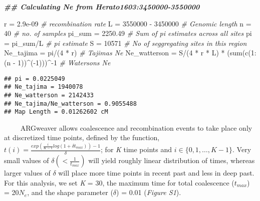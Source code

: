 \documentclass[
]{article}
\newenvironment{Shaded}{\begin{snugshade}}{\end{snugshade}}
\newcommand{\CommentTok}[1]{\textcolor[rgb]{0.56,0.35,0.01}{\textit{#1}}}
\newcommand{\DecValTok}[1]{\textcolor[rgb]{0.00,0.00,0.81}{#1}}
\newcommand{\DocumentationTok}[1]{\textcolor[rgb]{0.56,0.35,0.01}{\textbf{\textit{#1}}}}
\newcommand{\FloatTok}[1]{\textcolor[rgb]{0.00,0.00,0.81}{#1}}
\newcommand{\FunctionTok}[1]{\textcolor[rgb]{0.00,0.00,0.00}{#1}}
\newcommand{\NormalTok}[1]{#1}
\newcommand{\OtherTok}[1]{\textcolor[rgb]{0.56,0.35,0.01}{#1}}
\newcommand{\SpecialCharTok}[1]{\textcolor[rgb]{0.00,0.00,0.00}{#1}}
\begin{document}
\begin{Shaded}
\begin{Highlighting}[]
\DocumentationTok{\#\# Calculating Ne from Herato1603:3450000{-}3550000}

\NormalTok{r }\OtherTok{=} \FloatTok{2.9e{-}09}  \CommentTok{\# recombination rate}
\NormalTok{L }\OtherTok{=} \DecValTok{3550000} \SpecialCharTok{{-}} \DecValTok{3450000}  \CommentTok{\# Genomic length}
\NormalTok{n }\OtherTok{=} \DecValTok{40}  \CommentTok{\# no. of samples}
\NormalTok{pi\_sum }\OtherTok{=} \FloatTok{2250.49}  \CommentTok{\# Sum of pi estimates across all sites}
\NormalTok{pi }\OtherTok{=}\NormalTok{ pi\_sum}\SpecialCharTok{/}\NormalTok{L  }\CommentTok{\# pi estimate}
\NormalTok{S }\OtherTok{=} \DecValTok{10571}  \CommentTok{\# No of seggregating sites in this region }
\NormalTok{Ne\_tajima }\OtherTok{=}\NormalTok{ pi}\SpecialCharTok{/}\NormalTok{(}\DecValTok{4} \SpecialCharTok{*}\NormalTok{ r)  }\CommentTok{\# Tajima\textquotesingle{}s Ne}
\NormalTok{Ne\_watterson }\OtherTok{=}\NormalTok{ S}\SpecialCharTok{/}\NormalTok{(}\DecValTok{4} \SpecialCharTok{*}\NormalTok{ r }\SpecialCharTok{*}\NormalTok{ L) }\SpecialCharTok{*}\NormalTok{ (}\FunctionTok{sum}\NormalTok{(}\FunctionTok{c}\NormalTok{(}\DecValTok{1}\SpecialCharTok{:}\NormalTok{(n }\SpecialCharTok{{-}} \DecValTok{1}\NormalTok{))}\SpecialCharTok{\^{}}\NormalTok{(}\SpecialCharTok{{-}}\DecValTok{1}\NormalTok{)))}\SpecialCharTok{\^{}{-}}\DecValTok{1}  \CommentTok{\# Waterson\textquotesingle{}s Ne}
\end{Highlighting}
\end{Shaded}

\begin{verbatim}
## pi = 0.0225049 
## Ne_tajima = 1940078 
## Ne_watterson = 2142433 
## Ne_tajima/Ne_watterson = 0.9055488
## Map Length = 0.01262602 cM
\end{verbatim}

   ARGweaver allows coalescence and recombination events to take place
only at discretized time points, defined by the function,
\(t(i)=\frac {exp(\frac{ i}{K−1}log(1+\delta t_{max}))−1}{\delta}\); for
\emph{K} time points and \(i\in{\{0, 1, …, K−1\}}\). Very small values
of \(\delta ( <\frac {1}{t_{max}})\) will yield roughly linear
distribution of times, whereas larger values of \(\delta\) will place
more time points in recent past and less in deep past. For this
analysis, we set \emph{K} = 30, the maximum time for total coalescence
(\(t_{max}\)) = 20\(N_e\), and the shape parameter (\(\delta\)) = 0.01
(\emph{Figure S1}).
\end{document}

